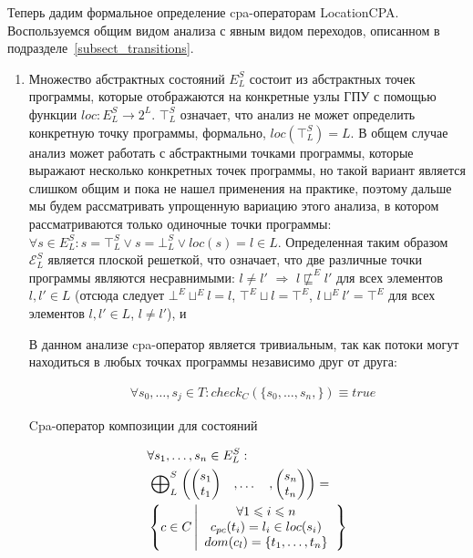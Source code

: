 Теперь дадим формальное определение cpa-операторам LocationCPA.
Воспользуемся общим видом анализа с явным видом переходов, описанном в подразделе~\ref{subsect_transitions}.
 
\begin{enumerate}

\item 
Множество абстрактных состояний $E^S_L$ состоит из абстрактных точек программы, которые отображаются на конкретные узлы ГПУ с помощью функции $loc: E^S_L \rightarrow 2^L$.
$\top^S_L$ означает, что анализ не может определить конкретную точку программы, формально, $loc(\top^S_L) = L$.
В общем случае анализ может работать с абстрактными точками программы, которые выражают несколько конкретных точек программы, но такой вариант является слишком общим и пока не нашел применения на практике, поэтому дальше мы будем рассматривать упрощенную вариацию этого анализа, в котором рассматриваются только одиночные точки программы: $\forall s \in E^S_L: s = \top^S_L \lor s=\bot^S_L \lor loc(s) = l \in L$.
Определенная таким образом $\mathcal{E}^S_L$ является плоской решеткой, что означает, что две различные точки программы являются несравнимыми: $l \neq l'$ $\Rightarrow$ $l \not\sqsubseteq^E l'$ для всех элементов $l, l' \in L$ 
(отсюда следует $\bot^E \sqcup^E l = l$, $\top^E \sqcup l=\top^E$, $ l\sqcup^E l' = \top^E$ для всех элементов $l,l'\in L$, $l\neq l'$), 
и

В данном анализе cpa-оператор является тривиальным, так как потоки могут находиться в любых точках программы независимо друг от друга:

\begin{align*}
& \forall s_0, \dots, s_j \in T: check_C(\{s_0, \dots, s_n,\}) \equiv true
\end{align*}

Cpa-оператор композиции для состояний

\begin{equation}
\label{location_epp_def}
\begin{aligned}
&\forall s_1, \dots, s_n \in E^S_L:\\
&\mathrel{\bigoplus}^S_{L}
\begin{pmatrix}
\begin{pmatrix}
s_1 \\
t_1 
\end{pmatrix}& ,
\dots& ,
\begin{pmatrix}
s_n \\
t_n 
\end{pmatrix}
\end{pmatrix} = \\
& \left\lbrace c \in C 
\left| 
\begin{array}{c}
\forall 1 \leqslant i \leqslant n \\
c_{pc}(t_i) = l_i \in loc(s_i) \\
dom(c_l) = \{t_1, \dots, t_n\}\\
\end{array}
\right.
\right\rbrace\\
\end{aligned}
\end{equation}


\end{enumerate}
